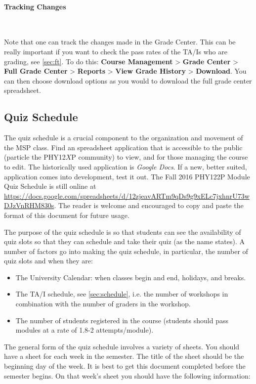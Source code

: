 \documentclass[12pt]{article}
\newcommand{\subsubsubsection}[1]{\paragraph{#1}\mbox{}\\}
\begin{document}
\subsubsubsection{Tracking Changes} \label{sec:trackchanges}

\noindent Note that one can track the changes made in the Grade Center. This can be really important if you want to check the pass rates of the TA/Is who are grading, see \ref{sec:ft}. To do this: \textbf{Course Management} > \textbf{Grade Center} > \textbf{Full Grade Center} > \textbf{Reports} > \textbf{View Grade History} > \textbf{Download}. You can then choose download options as you would to download the full grade center spreadsheet.

\subsection{Quiz Schedule} \label{sec:qs}

\indent The quiz schedule is a crucial component to the organization and movement of the MSP class. Find an spreadsheet application that is accessible to the public (particle the PHY12$X$P community) to view, and for those managing the course to edit. The historically used application is \emph{Google Docs}. If a new, better suited, application comes into development, test it out. The Fall 2016 PHY122P Module Quiz Schedule is still online at \url{https://docs.google.com/spreadsheets/d/12zjeavARTm9qDs9g9xELc7jxhnrU73wDJzVnRHM830s}. The reader is welcome and encouraged to copy and paste the format of this document for future usage.

\indent The purpose of the quiz schedule is so that students can see the availability of quiz slots so that they can schedule and take their quiz (as the name states). A number of factors go into making the quiz schedule, in particular, the number of quiz slots and when they are:

\begin{itemize}
	\item The University Calendar: when classes begin and end, holidays, and breaks.
	\item The TA/I schedule, see \ref{sec:schedule}, i.e. the number of workshops in combination with the number of graders in the workshop.
	\item The number of students registered in the course (students should pass modules at a rate of 1.8-2 attempts/module).
\end{itemize}

\indent The general form of the quiz schedule involves a variety of sheets. You should have a sheet for each week in the semester. The title of the sheet should be the beginning day of the week. It is best to get this document completed before the semester begins. On that week's sheet you should have the following information:
\end{document}
